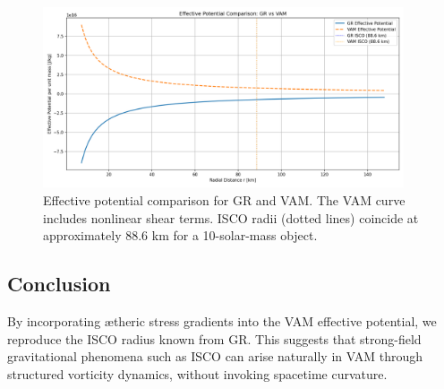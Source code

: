 \begin{figure}[H]
\centering
\includegraphics[width=0.95\textwidth]{VAM_GR_ISCO_Benchmark.png}
\caption{Effective potential comparison for GR and VAM. The VAM curve includes nonlinear shear terms. ISCO radii (dotted lines) coincide at approximately 88.6 km for a 10-solar-mass object.}
\end{figure}

\subsection{Conclusion}

By incorporating ætheric stress gradients into the VAM effective potential, we reproduce the ISCO radius known from GR. This suggests that strong-field gravitational phenomena such as ISCO can arise naturally in VAM through structured vorticity dynamics, without invoking spacetime curvature.

